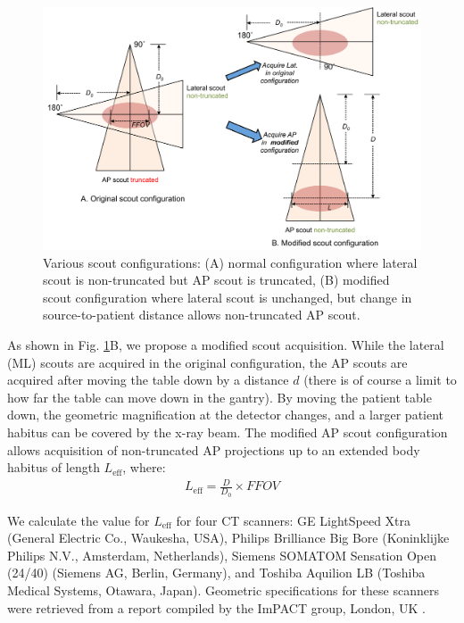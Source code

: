 \documentclass[]{spie}
\begin{document}
\begin{figure}[hbtp]
\centering
\includegraphics[width=15 cm]{fig-geometry}
\caption{Various scout configurations: (A) normal configuration where lateral scout is non-truncated but AP scout is truncated, (B) modified scout configuration where lateral scout is unchanged, but change in source-to-patient distance allows non-truncated AP scout. \label{fig:scout_configurations}
}
\end{figure}

As shown in Fig. \ref{fig:scout_configurations}B, we propose a modified scout acquisition. While the lateral (ML) scouts are acquired in the original configuration, the AP scouts are acquired after moving the table down by a distance $d$ (there is of course a limit to how far the table can move down in the gantry). By moving the patient table down, the geometric magnification at the detector changes, and a larger patient habitus can be covered by the x-ray beam. The modified AP scout configuration allows acquisition of non-truncated AP projections up to an extended body habitus of length $L_{\mathrm{eff}}$, where:
\begin{align}
L_{\mathrm{eff}} = \frac{D}{D_0}\times FFOV
\end{align}

We calculate the value for $L_{\mathrm{eff}}$ for four CT scanners: GE LightSpeed Xtra (General Electric Co., Waukesha, USA), Philips Brilliance Big Bore (Koninklijke Philips N.V., Amsterdam, Netherlands), Siemens SOMATOM Sensation Open (24/40) (Siemens AG, Berlin, Germany), and Toshiba Aquilion LB (Toshiba Medical Systems, Otawara, Japan). Geometric specifications for these scanners were retrieved from a report compiled by the ImPACT group, London, UK \cite{ImPACTCenterforEvidencebasedPurchasing2009}. 
\end{document}
